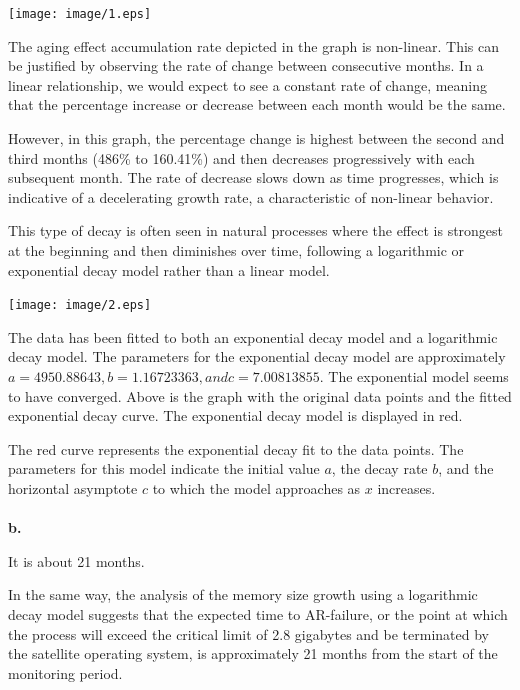 \documentclass[12pt]{article}
\numberwithin{table}{section}
\begin{document}
	\begin{center}
		\texttt{[image: image/1.eps]}
	\end{center}

	The aging effect accumulation rate depicted in the graph is non-linear. This can be justified by observing the rate of change between consecutive months. In a linear relationship, we would expect to see a constant rate of change, meaning that the percentage increase or decrease between each month would be the same.
	
	However, in this graph, the percentage change is highest between the second and third months (486\% to 160.41\%) and then decreases progressively with each subsequent month. The rate of decrease slows down as time progresses, which is indicative of a decelerating growth rate, a characteristic of non-linear behavior.

	This type of decay is often seen in natural processes where the effect is strongest at the beginning and then diminishes over time, following a logarithmic or exponential decay model rather than a linear model.
	
	\begin{center}
		\texttt{[image: image/2.eps]}
	\end{center}
	
	The data has been fitted to both an exponential decay model and a logarithmic decay model. The parameters for the exponential decay model are approximately $a= 4950.88643,  b=1.16723363, and 
	c=7.00813855. $ The exponential model seems to have converged. Above is the graph with the original data points and the fitted exponential decay curve. The exponential decay model is displayed in red.
	
	The red curve represents the exponential decay fit to the data points. The parameters for this model indicate the initial value  $a$, the decay rate $b$, and the horizontal asymptote $c$ to which the model approaches as $x$ increases.\\
	\\
	\textbf{b.}
	
	It is about 21 months.
	
	In the same way, the analysis of the memory size growth using a logarithmic decay model suggests that the expected time to AR-failure, or the point at which the process will exceed the critical limit of 2.8 gigabytes and be terminated by the satellite operating system, is approximately 21 months from the start of the monitoring period.
	
\end{document}
